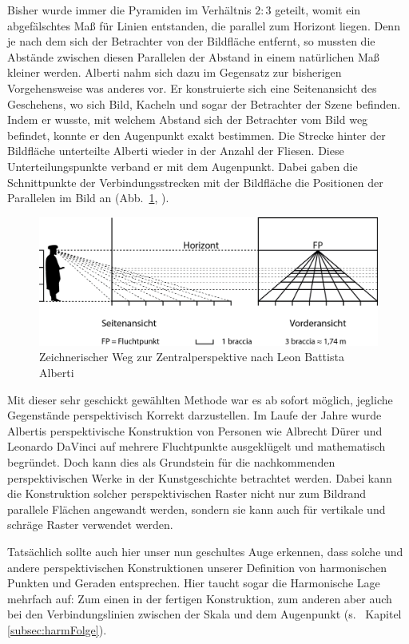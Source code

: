 \documentclass[12pt,a4paper]{article}
\begin{document}
Bisher wurde immer die Pyramiden im Verhältnis $2 : 3$ geteilt, womit ein abgefälschtes Maß für Linien entstanden, die parallel zum Horizont liegen. Denn je nach dem sich der Betrachter von der Bildfläche entfernt, so mussten die Abstände zwischen diesen Parallelen der Abstand in einem natürlichen Maß kleiner werden. Alberti nahm sich dazu im Gegensatz zur bisherigen Vorgehensweise was anderes vor. Er konstruierte sich eine Seitenansicht des Geschehens, wo sich Bild, Kacheln und sogar der Betrachter der Szene befinden. Indem er wusste, mit welchem Abstand sich der Betrachter vom Bild weg befindet, konnte er den Augenpunkt exakt bestimmen. Die Strecke hinter der Bildfläche unterteilte Alberti wieder in der Anzahl der Fliesen. Diese Unterteilungspunkte verband er mit dem Augenpunkt. Dabei gaben die Schnittpunkte der Verbindungsstrecken mit der Bildfläche die Positionen der Parallelen im Bild an (Abb.~\ref{fig:braccia}, \citep[vgl.][S.~31ff]{perspektive}).

\begin{figure}[htbp] 
\centering
\includegraphics[width=\textwidth]{Bilder/braccia.png}
\caption{Zeichnerischer Weg zur Zentralperspektive nach Leon Battista Alberti}
\label{fig:braccia}
\end{figure}

Mit dieser sehr geschickt gewählten Methode war es ab sofort möglich, jegliche Gegenstände perspektivisch Korrekt darzustellen. Im Laufe der Jahre wurde Albertis perspektivische Konstruktion von Personen wie Albrecht Dürer und Leonardo DaVinci auf mehrere Fluchtpunkte ausgeklügelt und mathematisch begründet. Doch kann dies als Grundstein für die nachkommenden perspektivischen Werke in der Kunstgeschichte betrachtet werden. Dabei kann die Konstruktion solcher perspektivischen Raster nicht nur zum Bildrand parallele Flächen angewandt werden, sondern sie kann auch für vertikale und schräge Raster verwendet werden.


Tatsächlich sollte auch hier unser nun geschultes Auge erkennen, dass solche und andere perspektivischen Konstruktionen unserer Definition von harmonischen Punkten und Geraden entsprechen. Hier taucht sogar die Harmonische Lage mehrfach auf: Zum einen in der fertigen Konstruktion, zum anderen aber auch bei den Verbindungslinien zwischen der Skala und dem Augenpunkt (s.~ Kapitel \ref{subsec:harmFolge}).
\end{document}
